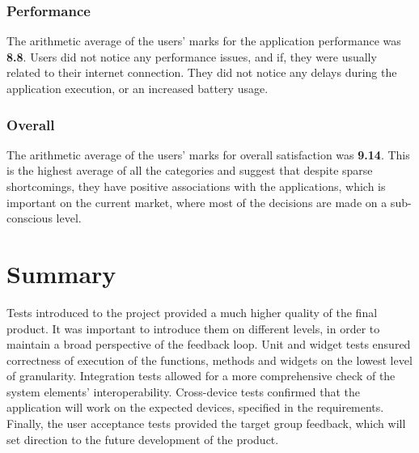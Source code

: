 \subsubsection{Performance}
The arithmetic average of the users' marks for the application performance was \textbf{8.8}. Users did not notice any performance issues, and if, they were usually related to their internet connection. They did not notice any delays during the application execution, or an increased battery usage. 


\subsubsection{Overall}
The arithmetic average of the users' marks for overall satisfaction was \textbf{9.14}. This is the highest average of all the categories and suggest that despite sparse shortcomings, they have positive associations with the applications, which is important on the current market, where most of the decisions are made on a sub-conscious level. 


\section{Summary}\label{sec:tests:summary}
Tests introduced to the project provided a much higher quality of the final product. It was important to introduce them on different levels, in order to maintain a broad perspective of the feedback loop. Unit and widget tests ensured correctness of execution of the functions, methods and widgets on the lowest level of granularity. Integration tests allowed for a more comprehensive check of the system elements' interoperability. Cross-device tests confirmed that the application will work on the expected devices, specified in the requirements. Finally, the user acceptance tests provided the target group feedback, which will set direction to the future development of the product.